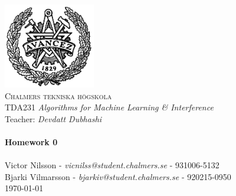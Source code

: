 
\begin{titlepage}
\begin{center}


~\\[1.0cm]
 \includegraphics[width=0.3\textwidth]{Figures/chalmers.png}~\\[1.0cm]

\textsc{\LARGE Chalmers tekniska högskola}\\[0.3cm]
TDA231 \textit{Algorithms for Machine Learning \& Interference}\\
Teacher: \textit{Devdatt Dubhashi} \\

\HRule \\[0.3cm]
{ \huge \bfseries Homework 0 \\[0.3cm] }
\HRule \\[0.3cm]

Victor Nilsson  -  \textit{vicnilss@student.chalmers.se} - 931006-5132\\ [0.3cm]
Bjarki Vilmarsson  -  \textit{bjarkiv@student.chalmers.se} - 920215-0950\\ [0.3cm]


\vfill
{\large \today}

\end{center}
\end{titlepage}

\newpage